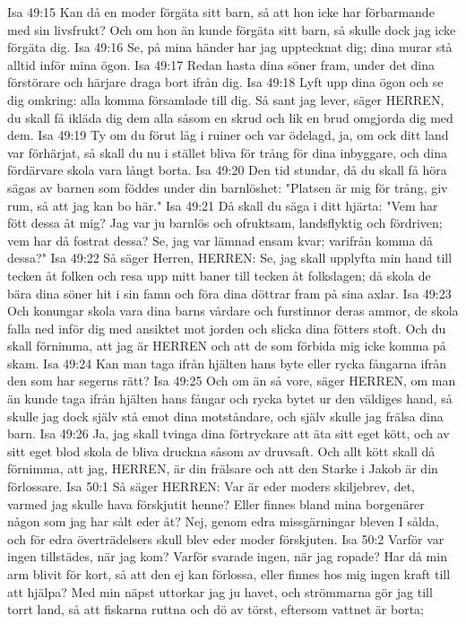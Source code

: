 Isa 49:15  Kan då en moder förgäta sitt barn, så att hon icke har förbarmande med sin livsfrukt? Och om hon än kunde förgäta sitt barn, så skulle dock jag icke förgäta dig.
Isa 49:16  Se, på mina händer har jag upptecknat dig; dina murar stå alltid inför mina ögon.
Isa 49:17  Redan hasta dina söner fram, under det dina förstörare och härjare draga bort ifrån dig.
Isa 49:18  Lyft upp dina ögon och se dig omkring: alla komma församlade till dig. Så sant jag lever, säger HERREN, du skall få ikläda dig dem alla såsom en skrud och lik en brud omgjorda dig med dem.
Isa 49:19  Ty om du förut låg i ruiner och var ödelagd, ja, om ock ditt land var förhärjat, så skall du nu i stället bliva för trång för dina inbyggare, och dina fördärvare skola vara långt borta.
Isa 49:20  Den tid stundar, då du skall få höra sägas av barnen som föddes under din barnlöshet: "Platsen är mig för trång, giv rum, så att jag kan bo här."
Isa 49:21  Då skall du säga i ditt hjärta: "Vem har fött dessa åt mig? Jag var ju barnlös och ofruktsam, landsflyktig och fördriven; vem har då fostrat dessa? Se, jag var lämnad ensam kvar; varifrån komma då dessa?"
Isa 49:22  Så säger Herren, HERREN: Se, jag skall upplyfta min hand till tecken åt folken och resa upp mitt baner till tecken åt folkslagen; då skola de bära dina söner hit i sin famn och föra dina döttrar fram på sina axlar.
Isa 49:23  Och konungar skola vara dina barns vårdare och furstinnor deras ammor, de skola falla ned inför dig med ansiktet mot jorden och slicka dina fötters stoft. Och du skall förnimma, att jag är HERREN och att de som förbida mig icke komma på skam.
Isa 49:24  Kan man taga ifrån hjälten hans byte eller rycka fångarna ifrån den som har segerns rätt?
Isa 49:25  Och om än så vore, säger HERREN, om man än kunde taga ifrån hjälten hans fångar och rycka bytet ur den väldiges hand, så skulle jag dock själv stå emot dina motståndare, och själv skulle jag frälsa dina barn.
Isa 49:26  Ja, jag skall tvinga dina förtryckare att äta sitt eget kött, och av sitt eget blod skola de bliva druckna såsom av druvsaft. Och allt kött skall då förnimma, att jag, HERREN, är din frälsare och att den Starke i Jakob är din förlossare.
Isa 50:1  Så säger HERREN: Var är eder moders skiljebrev, det, varmed jag skulle hava förskjutit henne? Eller finnes bland mina borgenärer någon som jag har sålt eder åt? Nej, genom edra missgärningar bleven I sålda, och för edra överträdelsers skull blev eder moder förskjuten.
Isa 50:2  Varför var ingen tillstädes, när jag kom? Varför svarade ingen, när jag ropade? Har då min arm blivit för kort, så att den ej kan förlossa, eller finnes hos mig ingen kraft till att hjälpa? Med min näpst uttorkar jag ju havet, och strömmarna gör jag till torrt land, så att fiskarna ruttna och dö av törst, eftersom vattnet är borta;
